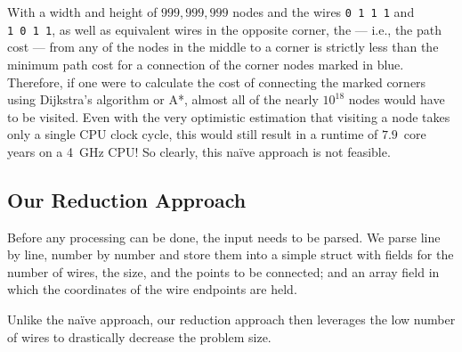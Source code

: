 \documentclass[sigconf,nonacm,screen]{acmart}
\begin{document}
With a width and height of $999,999,999$ nodes and the wires
\texttt{0~1~1~1} and \texttt{1~0~1~1},
as well as equivalent wires in the opposite corner, the  --- i.e., the path cost --- from any of the nodes in the middle to a corner is strictly less than the minimum path cost for a connection of the corner nodes marked in blue. Therefore, if one were to calculate the cost of connecting the marked corners using Dijkstra's algorithm or A*, almost all of the nearly $10^{18}$ nodes would have to be visited. Even with the very optimistic estimation that visiting a node takes only a single CPU clock cycle, this would still result in a runtime of $7.9$~core years on a 4~GHz CPU!
So clearly, this na\"ive approach is not feasible.

\subsection{Our Reduction Approach}
Before any processing can be done, the input needs to be parsed. We parse line by line, number by number and store them into a simple struct with fields for the number of wires, the size, and the points to be connected; and an array field in which the coordinates of the wire endpoints are held. 

Unlike the na\"ive approach, our reduction approach then leverages the low number of wires to drastically decrease the problem size.
\end{document}
